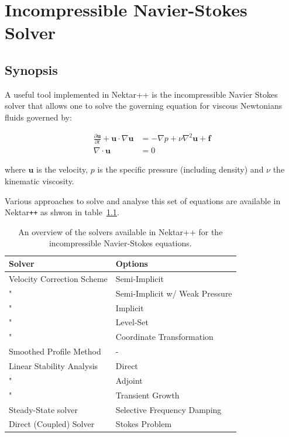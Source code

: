 \chapter{Incompressible Navier-Stokes Solver}
\label{IncNSsolver}

\section{Synopsis}
A useful tool implemented in Nektar++ is the incompressible Navier
Stokes solver that allows one to solve the governing equation for
viscous Newtonians fluids governed by:

\begin{subequations}
\begin{align}
    \frac{\partial \mathbf{u}}{\partial t} + \mathbf{u} \cdot \nabla \mathbf{u} &= -\nabla p + \nu \nabla^2 \mathbf{u} +  \mathbf{f} \label{eqn.NSmom} \\
    \nabla \cdot \mathbf{u} &= 0
\end{align}
 \end{subequations}

where $\mathbf{u}$ is the velocity, $p$ is the specific pressure (including
density) and $\nu$ the kinematic viscosity.

Various approaches to solve and analyse this set of equations are 
available in Nektar\texttt{++} as shwon in table~\ref{tab.IncNSSolvers}.

\begin{table}
    \centering
\caption{An overview of the solvers available in Nektar++ for the incompressible Navier-Stokes equations.}
\begin{tabular}{ll}
    Solver & Options\\
    \toprule
    Velocity Correction Scheme & Semi-Implicit\\
    " & Semi-Implicit w/ Weak Pressure\\
    " & Implicit\\
	" & Level-Set \\
    " & Coordinate Transformation \\
    Smoothed Profile Method & -\\
    Linear Stability Analysis & Direct \\
    " & Adjoint \\
    " & Transient Growth \\
    Steady-State solver & Selective Frequency Damping \\
    Direct (Coupled) Solver & Stokes Problem \\
\end{tabular}
\label{tab.IncNSSolvers}
\end{table}


